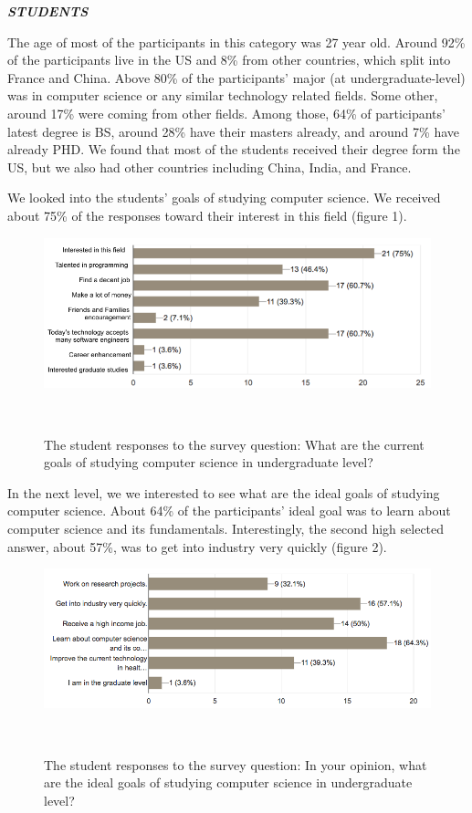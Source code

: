 \documentclass{sigchi}
\begin{document}
\textit{\textbf{STUDENTS}}

The age of most of the participants in this category was 27 year old. Around 92\% of the participants live in the US and 8\% from other countries, which split into France and China.  Above 80\% of the participants' major (at undergraduate-level) was in computer science or any similar technology related fields. Some other, around 17\% were coming from other fields. Among those, 64\% of participants' latest degree is BS, around 28\% have their masters already, and around 7\% have already PHD. We found that most of the students received their degree form the US, but we also had other countries including China, India, and France.

We looked into the students' goals of studying computer science. We received about 75\% of the responses toward their interest in this field (figure 1).

\begin{figure}
\centering
  \includegraphics[width=1.05\columnwidth]{figures/goals_s}
  \caption{The student responses to the survey question: What are the current goals of studying computer science in undergraduate level? }~\label{fig:figure1}
\end{figure}

In the next level, we we interested to see what are the ideal goals of studying computer science. About 64\% of the participants' ideal goal was to learn about computer science and its fundamentals. Interestingly, the second high selected answer, about 57\%, was to get into industry very quickly (figure 2).

\begin{figure}
\centering
  \includegraphics[width=1.05\columnwidth]{figures/ideal_goals_s}
  \caption{The student responses to the survey question: In your opinion, what are the ideal goals of studying computer science in undergraduate level?}~\label{fig:figure2}
\end{figure}
\end{document}
